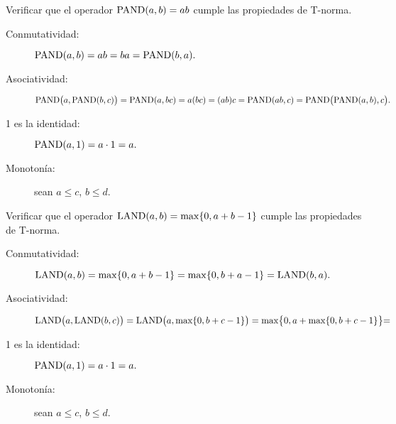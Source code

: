 Verificar que el operador \(\operatorname{PAND}(a, b) = ab\)
cumple las propiedades de T-norma.
%
\begin{description}
  \item[Conmutatividad:]
    \(
      \operatorname{PAND}(a, b) =
      ab =
      ba =
      \operatorname{PAND}(b, a).
    \)
  \item[Asociatividad:]
    \(
      \operatorname{PAND}\bigl(a, \operatorname{PAND}(b, c)\bigr) =
      \operatorname{PAND}(a, bc) =
      a(bc) =
      (ab)c =
      \operatorname{PAND}(ab, c) =
      \operatorname{PAND}\bigl(\operatorname{PAND}(a, b), c\bigr).
    \)
  \item[1 es la identidad:]
    \(
      \operatorname{PAND}(a, 1) = a\cdot 1 = a.
    \)
  \item[Monotonía:] sean \(a ≤ c\), \(b ≤ d\).

\end{description}

Verificar que el operador \(\operatorname{LAND}(a, b) = \max\{0, a + b - 1\}\)
cumple las propiedades de T-norma.
%
\begin{description}
  \item[Conmutatividad:]
    \(
      \operatorname{LAND}(a, b) =
      \max\{0, a + b - 1\} =
      \max\{0, b + a - 1\} =
      \operatorname{LAND}(b, a).
    \)
  \item[Asociatividad:]
    \(
      \operatorname{LAND}\bigl(a, \operatorname{LAND}(b, c)\bigr) =
      \operatorname{LAND}\bigl(a, \max\{0, b + c - 1\}\bigr) =
      \max\bigl\{0, a + \max\{0, b + c - 1\}\bigl\} =
    \)
  \item[1 es la identidad:]
    \(
      \operatorname{PAND}(a, 1) = a\cdot 1 = a.
    \)
  \item[Monotonía:] sean \(a ≤ c\), \(b ≤ d\).

\end{description}

